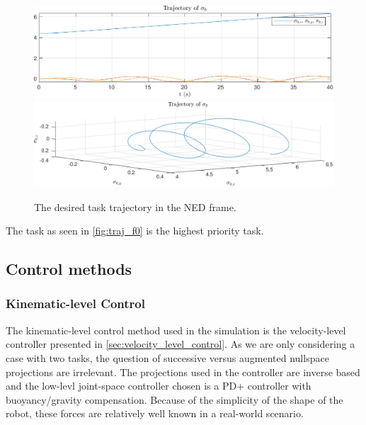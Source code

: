 \begin{figure}[h]
    \centering
    \includegraphics[width=\linewidth]{assets/plots/traj_xyz.pdf}
    \includegraphics[width=\linewidth]{assets/plots/traj_taskspace.pdf}
    \caption{The desired task trajectory in the NED frame.}
    \label{fig:traj_f0}
\end{figure}

The task as seen in \autoref{fig:traj_f0} is the highest priority task.


\subsection{Control methods}
\subsubsection{Kinematic-level Control}

The kinematic-level control method used in the simulation is the velocity-level
controller presented in \autoref{sec:velocity_level_control}. As we are only considering
a case with two tasks, the question of successive versus augmented nullspace projections
are irrelevant. The projections used in the controller are inverse based
and the low-levl joint-space controller chosen is a PD+ controller
with buoyancy/gravity compensation. Because of the simplicity of the shape of the robot,
these forces are relatively well known in a real-world scenario.

